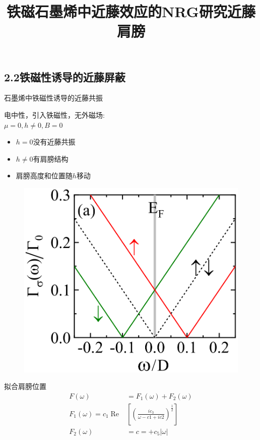 \documentclass[9pt,t]{beamer} %
\begin{document}
\subsection{2.2铁磁性诱导的近藤屏蔽}
\title{铁磁石墨烯中近藤效应的NRG研究\qquad \qquad \qquad \qquad 近藤肩膀}
\begin{frame}{石墨烯中铁磁性诱导的近藤共振}
\begin{minipage}[t]{0.55 \textwidth}
\begin{minipage}[t]{0.65 \textwidth}
电中性，引入铁磁性，无外磁场:\\
\text{ } \quad $\mu=0, h\neq 0, B=0$
\begin{itemize}
\item $h=0$没有近藤共振
\item $h\neq 0$有肩膀结构
\item 肩膀高度和位置随$h$移动
\end{itemize}
\end{minipage}%
\begin{minipage}[t]{0.45 \textwidth}
\begin{figure}
\includegraphics[width=\textwidth]{hyb1.png}
\end{figure}
\end{minipage}
\vspace{-0.4cm}
拟合肩膀位置
\vspace{-0.2cm}
\begin{equation}\nonumber
\begin{aligned} F(\omega) &=F_{1}(\omega)+F_{2}(\omega) \\ F_{1}(\omega)=c_{1} \operatorname{Re} &\left[\left(\frac{i c_{3}}{\omega-c 1+i c 2}\right)^{\frac{1}{2}}\right] \\ F_{2}(\omega) &=c=+c_{5}|\omega| \end{aligned}

\end{equation}
\end{minipage}
\end{frame}
\end{document}
